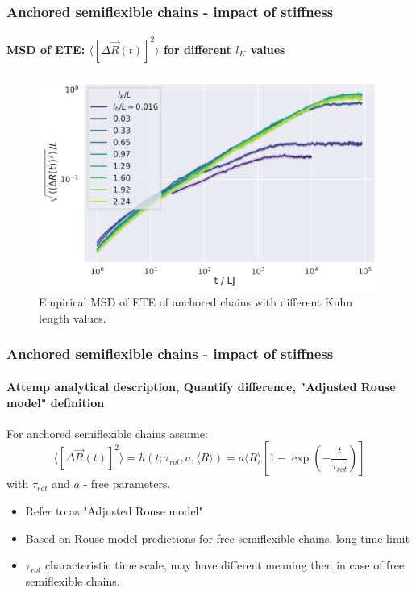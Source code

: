 \documentclass[handout]{beamer}
\newcommand{\mean}[1]{\langle #1 \rangle}
\newcommand{\E}[1]{\langle#1\rangle}
\begin{document}
\begin{frame}
    \frametitle{Anchored semiflexible chains - impact of stiffness}
    \framesubtitle{MSD of ETE: $\mean{[\Delta \vec{R}(t)]^2}$ for different $l_K$ values}

    \begin{figure}
        \centering
        \includegraphics[width=\columnwidth,trim={0cm 0cm 0cm 0.0cm},clip]{4-exp-delta_R-bare-log.png}
        \caption{Empirical MSD of ETE of anchored chains with different Kuhn length values.}
        \label{fig:msd_anchored_l_K}
    \end{figure}
\end{frame}


\begin{frame}
    \frametitle{Anchored semiflexible chains - impact of stiffness}
    \framesubtitle{Attemp analytical description, Quantify difference, "Adjusted Rouse model" definition}
    For anchored semiflexible chains assume:
    $$ \mean{[\Delta \vec{R}(t)]^2} = h(t; \tau_{rot}, a, \E{R}) = a \mean{R} [1 - \exp(-\frac{t}{\tau_{rot}})]$$
    with $\tau_{rot}$ and $a$ - free parameters.
    \begin{itemize}
        \item Refer to as "Adjusted Rouse model"
        \item Based on Rouse model predictions for free semiflexible chains, 
        long time limit
        \item $\tau_{rot}$ characteristic time scale, may have different meaning
        then in case of free semiflexible chains.
    \end{itemize}
\end{frame}
\end{document}
